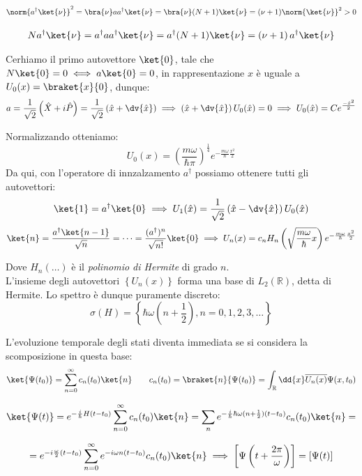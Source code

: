 \[
\norm{a^\dagger\ket{\nu}}^2 
= \bra{\nu} a a^\dagger \ket{\nu}
= \bra{\nu} (N + 1) \ket{\nu}
= (\nu + 1)\norm{\ket{\nu}}^2 > 0
\]

\[
N a^\dagger \ket{\nu}
= a^\dagger a a^\dagger \ket{\nu}
= a^\dagger (N + 1)\ket{\nu}
= (\nu + 1)\, a^\dagger \ket{\nu}
\]

Cerhiamo il primo autovettore \(\ket{0}\), tale che \(N\ket{0}=0 \iff a \ket{0}=0\), in rappresentazione \(x\) è uguale a \(U_0(x)= \braket{x}{0}\), dunque:
\[
    a= \frac{1}{\sqrt{2}}\left( \hat{X}+ i\hat{P} \right)   = \frac{1}{\sqrt{2}}\left( \hat{x}+ \dv{\hat{x}} \right) \implies \left( \hat{x}+ \dv{\hat{x}} \right)U_0(\hat{x})= 0 \implies U_0(\hat{x})= C e^{\frac{-\hat{x}^2}{2}}
\]

Normalizzando otteniamo:
\[
    U_0(x)= \left(  \frac{m\omega}{\hbar\pi }\right)^{\frac{1}{4}}e ^{-\frac{m\omega}{\hbar}\frac{x^2}{2}}    
\]
Da qui, con l'operatore di innzalzamento \(a^\dagger\) possiamo ottenere tutti gli autovettori:
\[
    \ket{1} = a^\dagger \ket{0}  \implies U_1(\hat{x})= \frac{1}{\sqrt{2}}\left( \hat{x}- \dv{\hat{x}} \right) U_0(\hat{x})
\]
\begin{equation}
    \ket{n} = \frac{a^\dagger\ket{n-1}}{\sqrt{n}} = \dots = \frac{(a^\dagger)^n}{\sqrt{n!}}\ket{0}  \implies U_n(x) = c_n H_n\left(\sqrt{\frac{m\omega}{\hbar}x}\right)e^{-\frac{m \omega}{\hbar}\frac{x^2}{2}}
\end{equation}

Dove \(H_n(\dots)\) è il \textit{polinomio di Hermite} di grado \(n\).\\
L'insieme degli autovettori \(\left\{ U_n(x) \right\}\) forma una base di \(L_2(\mathbb{R})\), detta di Hermite.
Lo spettro è dunque puramente discreto:
\[
    \sigma(H)= \left\{ \hbar\omega(n + \frac{1}{2}), n = 0,1,2,3,\dots \right\}
\]

L'evoluzione temporale degli stati diventa immediata se si considera la scomposizione in questa base:
\[
    \ket{\Psi(t_0)}  = \sum_{n= 0}^{\infty} c_n(t_0) \ket{n}  \qquad c_n(t_0) = \braket{n}{\Psi(t_0)}  = \int_\mathbb{R} \dd{x} \overline{U_n(x)} \Psi(x, t_0)
\]

\[
    \ket{\Psi(t)}  = e ^{-\frac{i}{\hbar}H (t-t_0)}\sum_{n= 0}^{\infty} c_n (t_0)\ket{n} = \sum_{n} e ^{-\frac{i}{\hbar}\hbar\omega(n + \frac{1}{2})(t-t_0)}c_n(t_0)\ket{n}=
\]

\[
    = e^{-i\frac{\omega}{2}(t-t_0)}\sum_{n = 0}^{\infty} e ^{-i\omega n(t-t_0)}c_n(t_0)\ket{n} \implies \left[ \Psi\left(t+ \frac{2\pi}{\omega}\right) \right]= \left[ \Psi(t) \right]
\]

